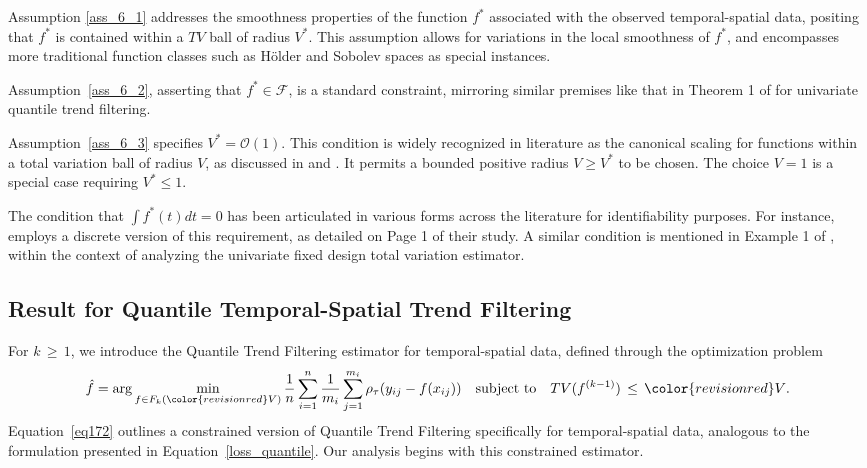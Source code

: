 \documentclass[twoside,11pt]{article}
\newcommand{\rev}[1]{{\color{revisionred}#1}}
\begin{document}
Assumption \ref{ass_6_1} addresses the smoothness properties of the function \(f^*\) associated with the observed temporal-spatial data, positing that \(f^*\) is contained within a \(TV\) ball of radius \(V^*\). This assumption allows for variations in the local smoothness of \(f^*\), and encompasses more traditional function classes such as Hölder and Sobolev spaces as special instances.

Assumption~\ref{ass_6_2}, asserting that \(f^* \in \mathcal{F}\), is a standard constraint, mirroring similar premises like that in Theorem 1 of \cite{madrid2022risk} for univariate quantile trend filtering.

Assumption~\ref{ass_6_3} specifies \(V^* = \mathcal{O}(1)\). This condition is widely recognized in literature as the canonical scaling for functions within a total variation ball of radius \(V\), as discussed in \cite{madrid2022risk} and \cite{sadhanala2016total}. \rev{It permits a bounded positive radius $V\geq V^*$ to be chosen. The choice $V=1$ is a special case requiring $V^*\leq1$.}

The condition that \( \int f^*(t)dt = 0 \) has been articulated in various forms across the literature for identifiability purposes. For instance, \cite{sadhanala2017additive} employs a discrete version of this requirement, as detailed on Page 1 of their study. A similar condition is mentioned in Example 1 of \cite{dalalyan2017prediction}, within the context of analyzing the univariate fixed design total variation estimator.




\subsection{Result for Quantile Temporal-Spatial Trend Filtering}



 For \(k \,\geq\, 1\), we introduce the Quantile Trend Filtering estimator for temporal-spatial data, defined through the optimization problem
\begin{align}
\label{eq172}
\hat{f} = \arg\min_{f\in F_k(\rev{V})} \frac{1}{n} \sum_{i=1}^{n} \frac{1}{m_i} \sum_{j=1}^{m_i} \rho_{\tau}(y_{ij} - f(x_{ij})) \quad \text{subject to} \quad TV(f^{(k-1)}) \,\leq\, \rev{V}.
\end{align}
Equation~\eqref{eq172} outlines a constrained version of Quantile Trend Filtering specifically for temporal-spatial data, analogous to the formulation presented in Equation~\eqref{loss_quantile}. Our analysis begins with this constrained estimator.
\end{document}
